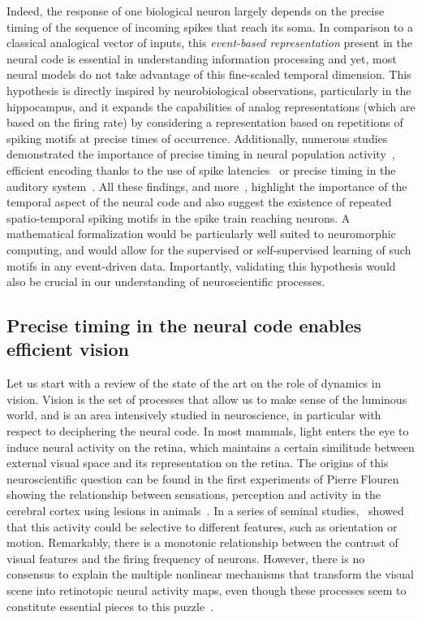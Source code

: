 \documentclass[brainsci, %
               review,submit,pdftex,moreauthors%
               ]{Definitions/mdpi}
\begin{document}
Indeed, the response of one biological neuron largely depends on the precise timing of the sequence of incoming spikes that reach its soma. In comparison to a classical analogical vector of inputs, this \emph{event-based representation} present in the neural code is essential in understanding information processing and yet, most neural models do not take advantage of this fine-scaled temporal dimension. This hypothesis is directly inspired by neurobiological observations, particularly in the hippocampus, and it expands the capabilities of analog representations (which are based on the firing rate) by considering a representation based on repetitions of spiking motifs at precise times of occurrence. 
Additionally, numerous studies demonstrated the importance of precise timing in neural population activity~\citep{davis_spontaneous_2021}, efficient encoding thanks to the use of spike latencies~\citep{perrinet_coding_2004,gollisch_rapid_2008} or precise timing in the auditory system~\citep{deweese_binary_2003,carr_circuit_1990}. All these findings, and more~\citep{bohte_evidence_2004}, highlight the importance of the temporal aspect of the neural code and also suggest the existence of repeated spatio-temporal spiking motifs in the spike train reaching neurons.  A mathematical formalization would be particularly well suited to neuromorphic computing, and would allow for the supervised or self-supervised learning of such motifs in any event-driven data.  Importantly, validating this hypothesis would also be crucial in our understanding of neuroscientific processes.
%
\subsection{Precise timing in the neural code enables efficient vision}
%
Let us start with a review of the state of the art on the role of dynamics in vision. Vision is the set of processes that allow us to make sense of the luminous world, and is an area intensively studied in neuroscience, in particular with respect to deciphering the neural code. In most mammals, light enters the eye to induce neural activity on the retina, which maintains a certain similitude between external visual space and its representation on the retina. The origins of this  neuroscientific question can be found in the first experiments of Pierre Flouren showing the relationship between sensations, perception and activity in the cerebral cortex using lesions in animals~\citep{pearce_marie-jean-pierre_2009}. In a series of seminal studies,~\citet{hubel_receptive_1968} showed that this activity could be selective to different features, such as orientation or motion. Remarkably, there is a monotonic relationship between the contrast of visual features and the firing frequency of neurons. However, there is no consensus to explain the multiple nonlinear mechanisms that transform the visual scene into retinotopic neural activity maps, even though these processes seem to constitute essential pieces to this puzzle~\citep{carandini_normalization_2012}. 
\end{document}
